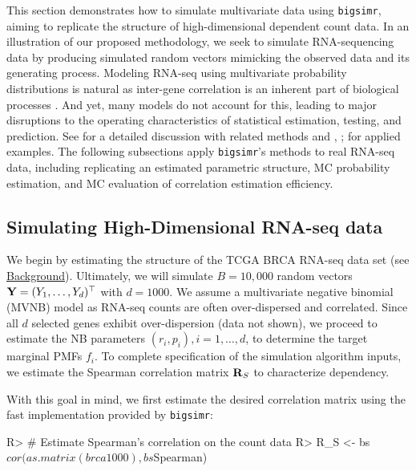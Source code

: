 \documentclass[
]{jss}
\begin{document}
This section demonstrates how to simulate multivariate data using
\texttt{bigsimr}, aiming to replicate the structure of high-dimensional
dependent count data. In an illustration of our proposed methodology, we
seek to simulate RNA-sequencing data by producing simulated random
vectors mimicking the observed data and its generating process. Modeling
RNA-seq using multivariate probability distributions is natural as
inter-gene correlation is an inherent part of biological processes
\citep{Wang2009b}. And yet, many models do not account for this, leading
to major disruptions to the operating characteristics of statistical
estimation, testing, and prediction. See \citet{Efron2012} for a
detailed discussion with related methods and \citet{Wu2012b},
\citet{Schissler2018}; \citet{Schissler2019} for applied examples. The
following subsections apply \texttt{bigsimr}'s methods to real RNA-seq
data, including replicating an estimated parametric structure, MC
probability estimation, and MC evaluation of correlation estimation
efficiency.

\hypertarget{simulating-high-dimensional-rna-seq-data}{%
\subsection{Simulating High-Dimensional RNA-seq
data}\label{simulating-high-dimensional-rna-seq-data}}

We begin by estimating the structure of the TCGA BRCA RNA-seq data set
(see \href{background}{Background}). Ultimately, we will simulate
\(B=10,000\) random vectors \({\bf Y}=(Y_1, \ldots, Y_d)^\top\) with
\(d=1000\). We assume a multivariate negative binomial (MVNB) model as
RNA-seq counts are often over-dispersed and correlated. Since all \(d\)
selected genes exhibit over-dispersion (data not shown), we proceed to
estimate the NB parameters \((r_i, p_i), i=1,\ldots,d\), to determine
the target marginal PMFs \(f_i\). To complete specification of the
simulation algorithm inputs, we estimate the Spearman correlation matrix
\({ \bf R}_{S}\) to characterize dependency.

With this goal in mind, we first estimate the desired correlation matrix
using the fast implementation provided by \texttt{bigsimr}:

\begin{CodeChunk}
\begin{CodeInput}
R> # Estimate Spearman's correlation on the count data
R> R_S <- bs$cor(as.matrix(brca1000), bs$Spearman)
\end{CodeInput}
\end{CodeChunk}
\end{document}

